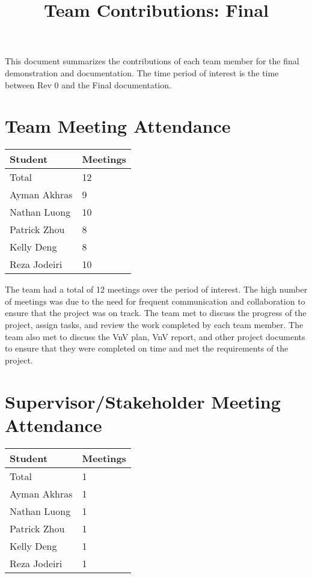 \documentclass{article}
\title{Team Contributions: Final\\\progname}
\author{\authname}
\date{}
\begin{document}
\maketitle

This document summarizes the contributions of each team member for the final
demonstration and documentation.  The time period of interest is the time
between Rev 0 and the Final documentation.

\section{Team Meeting Attendance}

\begin{table}[H]
\centering
\begin{tabular}{ll}
\toprule
\textbf{Student} & \textbf{Meetings}\\
\midrule
Total & 12\\
Ayman Akhras & 9\\
Nathan Luong & 10\\
Patrick Zhou & 8\\
Kelly Deng & 8\\
Reza Jodeiri & 10\\
\bottomrule
\end{tabular}
\end{table}


The team had a total of 12 meetings over the period of interest. The high number of meetings was due to the need for frequent communication and collaboration to ensure that the project was on track. The team met to discuss the progress of the project, assign tasks, and review the work completed by each team member. The team also met to discuss the VnV plan, VnV report, and other project documents to ensure that they were completed on time and met the requirements of the project.

\section{Supervisor/Stakeholder Meeting Attendance}

\begin{table}[H]
\centering
\begin{tabular}{ll}
\toprule
\textbf{Student} & \textbf{Meetings}\\
\midrule
Total & 1\\
Ayman Akhras & 1\\
Nathan Luong & 1\\
Patrick Zhou & 1\\
Kelly Deng & 1\\
Reza Jodeiri & 1\\
\bottomrule
\end{tabular}
\end{table}
\end{document}
